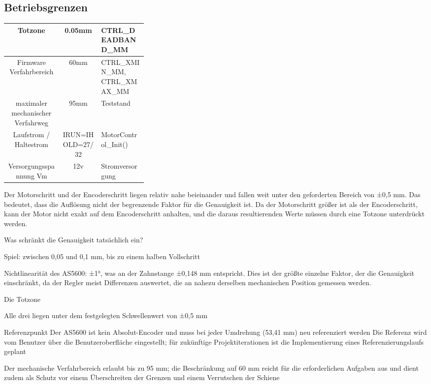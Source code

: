\subsection*{Betriebsgrenzen}
\begin{table}[h]
    \centering
    \begin{tabular}{|c|c|>{\centering\arraybackslash}p{0.33\linewidth}|}\hline
         Totzone&  0.05mm&  CTRL\_DEADBAND\_MM\\\hline
         Firmware Verfahrbereich&  60mm&  CTRL\_XMIN\_MM,
CTRL\_XMAX\_MM\\\hline
         maximaler mechanischer Verfahrweg&  95mm&  Teststand\\\hline
         Laufstrom / Haltestrom&  IRUN=IHOLD=27/32&  	MotorControl\_Init()\\\hline
         Versorgungsspannung Vm&  12v&  	Stromversorgung\\ \hline
    \end{tabular}
    
    
\end{table}

Der Motorschritt und der Encoderschritt liegen relativ nahe beieinander und fallen weit unter den geforderten Bereich von ±0,5 mm. Das bedeutet, dass die Auflösung nicht der begrenzende Faktor für die Genauigkeit ist.
Da der Motorschritt größer ist als der Encoderschritt, kann der Motor nicht exakt auf dem Encoderschritt anhalten, und die daraus resultierenden Werte müssen durch eine Totzone unterdrückt werden.

Was schränkt die Genauigkeit tatsächlich ein?
\item Spiel: zwischen 0,05 und 0,1 mm, bis zu einem halben Vollschritt
\item Nichtlinearität des AS5600: ±1°, was an der Zahnstange ±0,148 mm entspricht. Dies ist der größte einzelne Faktor, der die Genauigkeit einschränkt, da der Regler meist Differenzen auswertet, die an nahezu derselben mechanischen Position gemessen werden.
\item Die Totzone

Alle drei liegen unter dem festgelegten Schwellenwert von ±0,5 mm

Referenzpunkt
Der AS5600 ist kein Absolut-Encoder und muss bei jeder Umdrehung (53,41 mm) neu referenziert werden
Die Referenz wird vom Benutzer über die Benutzeroberfläche eingestellt; für zukünftige Projektiterationen ist die Implementierung eines Referenzierungslaufs geplant

Der mechanische Verfahrbereich erlaubt bis zu 95 mm; die Beschränkung auf 60 mm reicht für die erforderlichen Aufgaben aus und dient zudem als Schutz vor einem Überschreiten der Grenzen und einem Verrutschen der Schiene

